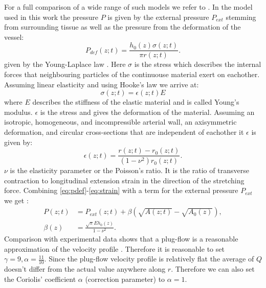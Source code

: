 \documentclass[a4paper, oneside]{discothesis}
\begin{document}
For a full comparison of a wide range of such models we refer to \cite{gomez2017analysis}.
In the model used in this work the pressure $P$ is given by the external pressure $P_{ext}$ stemming from surrounding tissue as well as the pressure from the deformation of the vessel:
\begin{equation}
	P_{def}(z;t) = \frac{h_0(z) \sigma(z;t)}{\pi r(z;t)}. \label{eq:pdef}
\end{equation}
given by the Young-Laplace law \cite{laplace1805traité} \cite{young1804essay}.
Here $\sigma$ is the stress which describes the internal forces that neighbouring particles of the continuouse material exert on eachother.
Assuming linear elasticity and using Hooke's law \cite{hooke1678lectures} we arrive at:
\begin{equation}
	\sigma(z;t) = \epsilon(z;t) E \label{eq:stress}
\end{equation}
where $E$ describes the stiffness of the elastic material and is called Young's modulus.
$\epsilon$ is the stress and gives the deformation of the material.
Assuming an isotropic, homogeneous, and incompressible arterial wall, an axisymmetric deformation, and circular cross-sections that are independent of eachother it $\epsilon$ is given by:
\begin{equation}
	\epsilon(z;t) = \frac{r(z;t)-r_0(z;t)}{ (1-\nu^2) r_0(z;t)}. \label{eq:strain}
\end{equation}
$\nu$ is the elasticity parameter or the Poisson's ratio.
It is the ratio of transverse contraction to longitudinal extension strain in the direction of the stretching force.
Combining \autoref{eq:pdef}-\autoref{eq:strain} with a term for the external pressure $P_{ext}$ we get \cite{sherwin2003one} \cite{sherwin2003computational}: 
\begin{align} 
	P(z;t) &= P_{ext}(z;t) + \beta \left( \sqrt{A(z;t)} - \sqrt{A_0(z)} \right),  \label{eq:p_tot}\\
	\beta(z) &=  \frac{\sqrt{\pi} E h_0(z)}{1-\nu^2}.
\end{align}
Comparison with experimental data shows that a plug-flow is a reasonable approximation of the velocity profile \cite{hunter1972numerical} \cite{smith2000generation} \cite{smith2002anatomically}.
Therefore it is reasonable to set $\gamma = 9, \alpha = \frac{11}{10}$.
Since the plug-flow velocity profile is relatively flat the average of $Q$ doesn't differ from the actual value anywhere along $r$.
Therefore we can also set the Coriolis' coefficient $\alpha$ (correction parameter) to $\alpha = 1$. \cite{formaggia2010cardiovascular}
\end{document}

